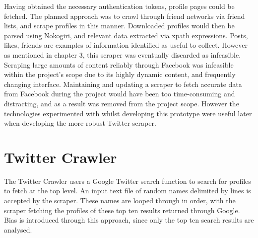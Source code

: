 Having obtained the necessary authentication tokens, profile pages could be fetched. The planned approach was to crawl through friend networks via friend lists, and scrape profiles in this manner. Downloaded profiles would then be parsed using Nokogiri, and relevant data extracted via xpath expressions. Posts, likes, friends are examples of information identified as useful to collect. However as mentioned in chapter 3, this scraper was eventually discarded as infeasible. Scraping large amounts of content reliably through Facebook was infeasible within the project's scope due to its highly dynamic content, and frequently changing interface. Maintaining and updating a scraper to fetch accurate data from Facebook during the project would have been too time-consuming and distracting, and as a result was removed from the project scope. However the technologies experimented with whilst developing this prototype were useful later when developing the more robust Twitter scraper.


\section{Twitter Crawler}

The Twitter Crawler users a Google Twitter search function to search for profiles to fetch at the top level. An input text file of random names delimited by lines is accepted by the scraper. These names are looped through in order, with the scraper fetching the profiles of these top ten results returned through Google. Bias is introduced through this approach, since only the top ten search results are analysed. 


